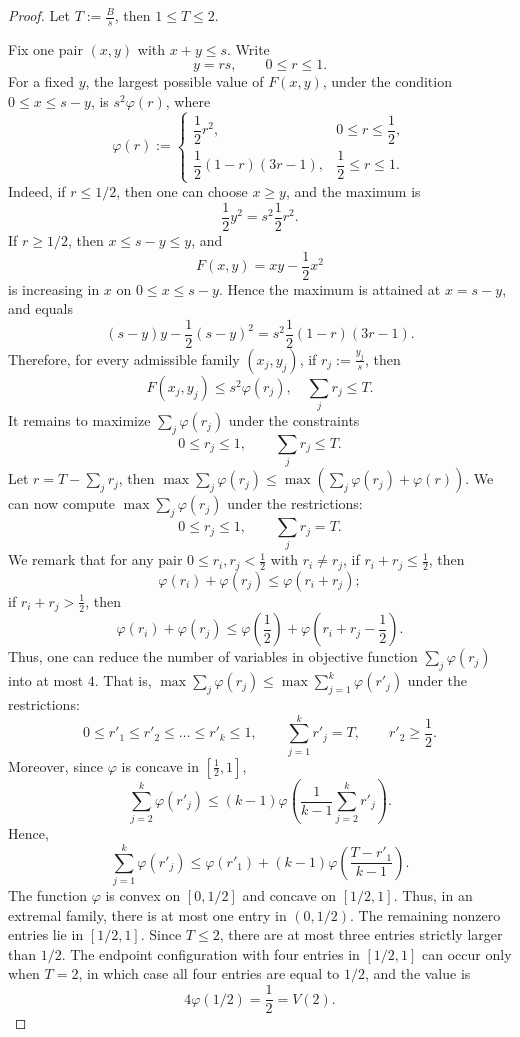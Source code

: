 \documentclass[10pt,a4paper]{amsart}
\begin{document}
\begin{proof}
Let $T:=\frac{B}{s}$, then \(1\le T\le 2\).

Fix one pair \((x,y)\) with $x+y\le s$. Write
\[
y=rs,
\qquad 0\le r\le 1.
\]
For a fixed \(y\), the largest possible value of \(F(x,y)\), under the condition
\(0\le x\le s-y\), is $s^2\varphi(r)$, where
\[
\varphi(r):=
\begin{cases}
\dfrac12r^2, & 0\le r\le \dfrac12,\\[6pt]
\dfrac12(1-r)(3r-1), & \dfrac12\le r\le 1.
\end{cases}
\]
Indeed, if \(r\le 1/2\), then one can choose \(x\ge y\), and the maximum is
\[
\frac12y^2=s^2\frac12r^2.
\]
If \(r\ge 1/2\), then \(x\le s-y\le y\), and
\[
F(x,y)=xy-\frac12x^2
\]
is increasing in \(x\) on \(0\le x\le s-y\).  Hence the maximum is attained at
\(x=s-y\), and equals
\[
(s-y)y-\frac12(s-y)^2
=
s^2\frac12(1-r)(3r-1).
\]
Therefore, for every admissible family \((x_j,y_j)\), if $r_j:=\frac{y_j}{s}$, then
\[
F(x_j,y_j)\le s^2\varphi(r_j),\quad\sum_j r_j\le T.
\]
It remains to maximize $\sum_j\varphi(r_j)$ under the constraints
\[
0\le r_j\le 1,
\qquad
\sum_j r_j\le T.
\]
Let $r=T-\sum_jr_j$, then $\max \sum_j\varphi(r_j) \leq \max (\sum_j\varphi(r_j)+\varphi(r))$. We can now compute $ \max \sum_j\varphi(r_j)$ under the restrictions:
\[
0\le r_j\le 1,
\qquad
\sum_j r_j= T.
\]
We remark that for any pair $0 \le r_i, r_j<\frac{1}{2}$ with $r_i \ne r_j$, if $r_i+r_j \leq \frac{1}{2}$, then $$\varphi(r_i)+\varphi(r_j) \leq \varphi(r_i+r_j);$$ if $r_i+r_j > \frac{1}{2}$, then $$\varphi(r_i)+\varphi(r_j) \leq \varphi(\frac{1}{2})+ \varphi(r_i+r_j-\frac{1}{2}).$$ Thus, one can reduce the number of variables in objective function $\sum_j\varphi(r_j)$ into at most $4$. That is, $\max \sum_j\varphi(r_j) \le \max \sum_{j=1}^k\varphi(r'_j)$ under the restrictions: 
\[
0\le r'_1 \le r'_2 \le \ldots \le r'_k\le 1
,\qquad
\sum_{j=1}^k r'_j= T
,\qquad r'_2 \ge \frac{1}{2}.
\]
Moreover, since $\varphi$ is concave in $[\frac{1}{2},1]$, 
$$\sum_{j=2}^k\varphi(r'_j) \leq (k-1)\varphi(\frac{1}{k-1}\sum_{j=2}^kr'_j).$$
Hence, $$\sum_{j=1}^k\varphi(r'_j) \leq \varphi(r'_1)+(k-1)\varphi(\frac{T-r'_1}{k-1}).$$
\iffalse
The function \(\varphi\) is convex on \([0,1/2]\) and concave on \([1/2,1]\).
Thus, in an extremal family, there is at most one entry in \((0,1/2)\).  The
remaining nonzero entries lie in \([1/2,1]\).  Since \(T\le 2\), there are at
most three entries strictly larger than \(1/2\).  The endpoint configuration
with four entries in \([1/2,1]\) can occur only when \(T=2\), in which case all
four entries are equal to \(1/2\), and the value is
\[
4\varphi(1/2)=\frac12=V(2).
\]


\end{proof}
\end{document}
